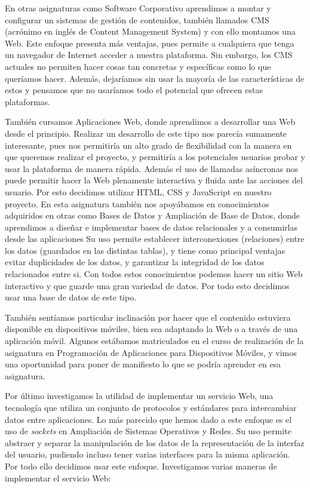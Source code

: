 En otras asignaturas como Software Corporativo aprendimos a montar y configurar un sistemas de gestión de contenidos, también llamados CMS (acrónimo en inglés de Content Management System) y con ello montamos una Web. Este enfoque presenta más ventajas, pues permite a cualquiera que tenga un navegador de Internet acceder a nuestra plataforma. Sin embargo, los CMS actuales no permiten hacer cosas tan concretas y específicas como lo que queríamos hacer. Además, dejaríamos sin usar la mayoría de las características de estos y pensamos que no usaríamos todo el potencial que ofrecen estas plataformas.
\vspace{1em}

También cursamos Aplicaciones Web, donde aprendimos a desarrollar una Web desde el principio. Realizar un desarrollo de este tipo nos parecía sumamente interesante, pues nos permitiría un alto grado de flexibilidad con la manera en que queremos realizar el proyecto, y permitiría a los potenciales usuarios probar y usar la plataforma de manera rápida. Además el uso de llamadas asíncronas nos puede permitir hacer la Web plenamente interactiva y fluida ante las acciones del usuario. Por esto decidimos utilizar HTML, CSS y JavaScript en nuestro proyecto. En esta asignatura también nos apoyábamos en conocimientos adquiridos en otras como Bases de Datos y Ampliación de Base de Datos, donde aprendimos a diseñar e implementar bases de datos relacionales y a consumirlas desde las aplicaciones Su uso permite establecer interconexiones (relaciones) entre los datos (guardados en las distintas tablas), y tiene como principal ventajas evitar duplicidades de los datos, y garantizar la integridad de los datos relacionados entre si. Con todos estos conocimientos podemos hacer un sitio Web interactivo y que guarde una gran variedad de datos. Por todo esto decidimos usar una base de datos de este tipo.
\vspace{1em}

También sentíamos particular inclinación por hacer que el contenido estuviera disponible en dispositivos móviles, bien sea adaptando la Web o a través de una aplicación móvil. Algunos estábamos matriculados en el curso de realización de la asignatura en Programación de Aplicaciones para Dispositivos Móviles, y vimos una oportunidad para poner de manifiesto lo que se podría aprender en esa asignatura.
\vspace{1em}

Por último investigamos la utilidad de implementar un servicio Web, una tecnología que utiliza un conjunto de protocolos y estándares para intercambiar datos entre aplicaciones. Lo más parecido que hemos dado a este enfoque es el uso de \emph{sockets} en Ampliación de Sistemas Operativos y Redes. Su uso permite abstraer y separar la manipulación de los datos de la representación de la interfaz del usuario, pudiendo incluso tener varias interfaces para la misma aplicación. Por todo ello decidimos usar este enfoque. Investigamos varias maneras de implementar el servicio Web:

